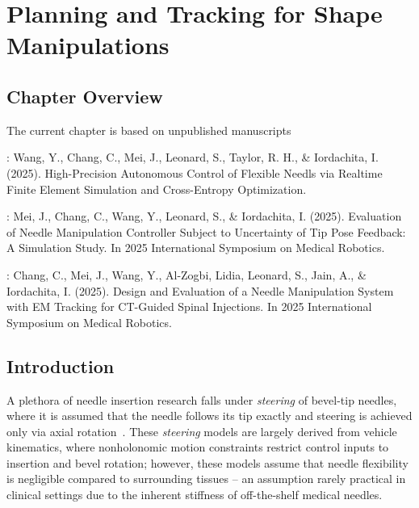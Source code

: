 \chapter{Planning and Tracking for Shape Manipulations} \label{chap:chap-5}

\section{Chapter Overview}
\label{sec:chap-5-overview}

The current chapter is based on unpublished manuscripts

\parencite{wangHighPrecisionAutonomousControl2025}: Wang, Y., Chang, C., Mei, J., Leonard, S., Taylor, R. H., \& Iordachita, I. (2025). High-Precision Autonomous Control of Flexible Needls via Realtime Finite Element Simulation and Cross-Entropy Optimization. 

\parencite{meiEvaluationNeedleManipulation2025}: Mei, J., Chang, C., Wang, Y., Leonard, S., \& Iordachita, I. (2025). Evaluation of Needle Manipulation Controller Subject to Uncertainty of Tip Pose Feedback: A Simulation Study. In 2025 International Symposium on Medical Robotics.

\parencite{changDesignEvaluationNeedle2025}: Chang, C., Mei, J., Wang, Y., Al-Zogbi, Lidia, Leonard, S., Jain, A., \& Iordachita, I. (2025). Design and Evaluation of a Needle Manipulation System with EM Tracking for CT-Guided Spinal Injections. In 2025 International Symposium on Medical Robotics.

\section{Introduction}
\label{sec:chap-5-introduction}

A plethora of needle insertion research falls under \textit{steering} of bevel-tip needles, where it is assumed that the needle follows its tip exactly and steering is achieved only via axial rotation~\parencite{liReviewTechniquesUsed2022}. These \textit{steering} models are largely derived from vehicle kinematics, where nonholonomic motion constraints restrict control inputs to insertion and bevel rotation; however, these models assume that needle flexibility is negligible compared to surrounding tissues -- an assumption rarely practical in clinical settings due to the inherent stiffness of off-the-shelf medical needles.

